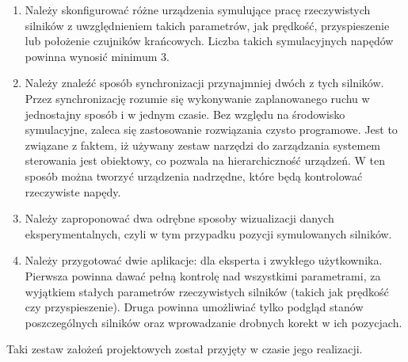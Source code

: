 \begin{enumerate}
	\item Należy skonfigurować różne urządzenia symulujące pracę rzeczywistych silników z uwzględnieniem takich parametrów, jak prędkość, przyspieszenie lub położenie czujników krańcowych. Liczba takich symulacyjnych napędów powinna wynosić minimum 3.
	\item Należy znaleźć sposób synchronizacji przynajmniej dwóch z tych silników. Przez synchronizację rozumie się wykonywanie zaplanowanego ruchu w jednostajny sposób i w jednym czasie. Bez względu na środowisko symulacyjne, zaleca się zastosowanie rozwiązania czysto programowe. Jest to związane z faktem, iż używany zestaw narzędzi do zarządzania systemem sterowania jest obiektowy, co pozwala na hierarchiczność urządzeń. W ten sposób można tworzyć urządzenia nadrzędne, które będą kontrolować rzeczywiste napędy.
	\item Należy zaproponować dwa odrębne sposoby wizualizacji danych eksperymentalnych, czyli w tym przypadku pozycji symulowanych silników.
	\item Należy przygotować dwie aplikacje: dla eksperta i zwykłego użytkownika. Pierwsza powinna dawać pełną kontrolę nad wszystkimi parametrami, za wyjątkiem stałych parametrów rzeczywistych silników (takich jak prędkość czy przyspieszenie). Druga powinna umożliwiać tylko podgląd stanów poszczególnych silników oraz wprowadzanie drobnych korekt w ich pozycjach.
\end{enumerate}

Taki zestaw założeń projektowych został przyjęty w czasie jego realizacji.